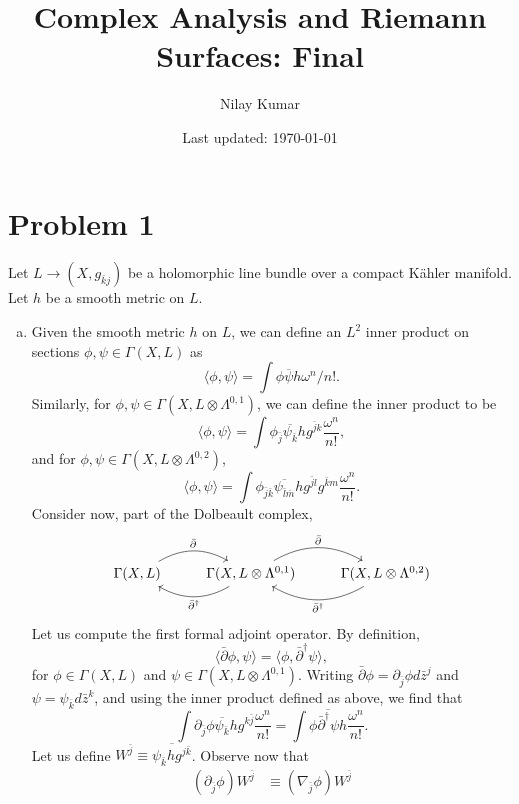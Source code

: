 \documentclass{../mathnotes}
\title{Complex Analysis and Riemann Surfaces: Final}
\author{Nilay Kumar}
\date{Last updated: \today}
\begin{document}
\maketitle

\section*{Problem 1}

Let $L\to (X,g_{\bar kj})$ be a holomorphic line bundle over a compact K\"ahler manifold. Let $h$ be a smooth
metric on $L$.
\begin{enumerate}[(a)]
    \item Given the smooth metric $h$ on $L$, we can define an $L^2$ inner product on sections $\phi,\psi\in \Gamma(X,L)$ as
        \[\langle\phi,\psi\rangle=\int \phi\overline{\psi} h\omega^n/n!.\]
        Similarly, for $\phi,\psi\in\Gamma(X,L\otimes\Lambda^{0,1})$, we can define the inner product to be
        \[\langle\phi,\psi\rangle=\int\phi_{\bar j}\overline{\psi_{\bar k}}hg^{\bar j k}\frac{\omega^n}{n!},\]
        and for $\phi,\psi\in\Gamma(X,L\otimes\Lambda^{0,2})$,
        \[\langle\phi,\psi\rangle=\int\phi_{\bar j\bar k}\overline{\psi_{\bar l\bar m}}hg^{\bar j l}g^{\bar k m}\frac{\omega^n}{n!}.\]
        Consider now, part of the Dolbeault complex,
        \begin{equation*}
            \begin{tikzcd}
                \Gamma(X,L)\ar[bend left]{r}{\bar\partial} & \Gamma(X,L\otimes\Lambda^{0,1})\ar[bend left]{r}{\bar\partial}\ar[bend left]{l}{\bar\partial^\dagger} & \Gamma(X,L\otimes \Lambda^{0,2})\ar[bend left]{l}{\bar\partial^\dagger}
            \end{tikzcd}
        \end{equation*}
        Let us compute the first formal adjoint operator. By definition,
        \[\langle \bar\partial\phi,\psi\rangle = \langle\phi,\bar\partial^\dagger\psi\rangle,\]
        for $\phi\in \Gamma(X,L)$ and $\psi\in \Gamma(X,L\otimes \Lambda^{0,1})$. Writing
        $\bar\partial\phi=\partial_{\bar j}\phi d\bar z^j$ and $\psi=\psi_{\bar k}d\bar z^k$, and using
        the inner product defined as above, we find that
        \[\int\partial_{\bar j}\phi\overline{\psi_{\bar k}}hg^{k\bar j}\frac{\omega^n}{n!}=\int \phi\overline{\bar\partial^\dagger\psi}h\frac{\omega^n}{n!}.\]
        Let us define $W^{\bar j}\equiv \overline{\psi_{\bar k}hg^{j\bar k}}$. Observe now that
        \begin{align*}
            \left( \partial_{\bar j}\phi\right)W^{\bar j}&\equiv\left( \nabla_{\bar j}\phi\right)W^{\bar j}\\

\end{align*}
\end{enumerate}
\end{document}
